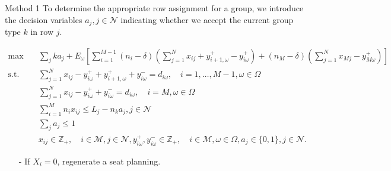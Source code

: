   \begin{frame}{Method 1}
    \scriptsize
    To determine the appropriate row assignment for a group, we introduce the decision variables $a_j, j \in \mathcal{N}$ indicating whether we accept the current group type $k$ in row $j$.
    
      \begin{tiny}
        \begin{equation}
        \begin{aligned}
        \max \quad & \sum_{j} k a_j + E_{\omega}\left[\sum_{i=1}^{M-1} (n_i-\delta) (\sum_{j= 1}^{N} x_{ij} + y_{i+1,\omega}^{+} - y_{i \omega}^{+}) + (n_{M}-\delta) (\sum_{j= 1}^{N} x_{Mj} - y_{M \omega}^{+})\right] \\
        \text {s.t.} \quad & \sum_{j= 1}^{N} x_{ij}-y_{i \omega}^{+}+
        y_{i+1, \omega}^{+} + y_{i \omega}^{-}=d_{i \omega}, \quad i = 1,\ldots,M-1, \omega \in \Omega \\
        & \sum_{j= 1}^{N} x_{ij} -y_{i \omega}^{+}+y_{i \omega}^{-}=d_{i \omega}, \quad i = M, \omega \in \Omega \\
        & \sum_{i=1}^{M} n_{i} x_{ij} \leq L_j - n_k a_j, j \in \mathcal{N} \\
        & \sum_{j} a_j \leq 1 \\
        & x_{ij} \in \mathbb{Z}_{+}, \quad i \in \mathcal{M}, j \in \mathcal{N}, y_{i \omega}^{+}, y_{i \omega}^{-} \in \mathbb{Z}_{+}, \quad i \in \mathcal{M}, \omega \in \Omega,  a_j \in \{0,1\}, j \in \mathcal{N}.
        \end{aligned}
      \end{equation}
    \end{tiny}
    \begin{itemize}      
      \item[-] If $X_i = 0$, regenerate a seat planning.
    \end{itemize}
  \end{frame}

      
      
  
